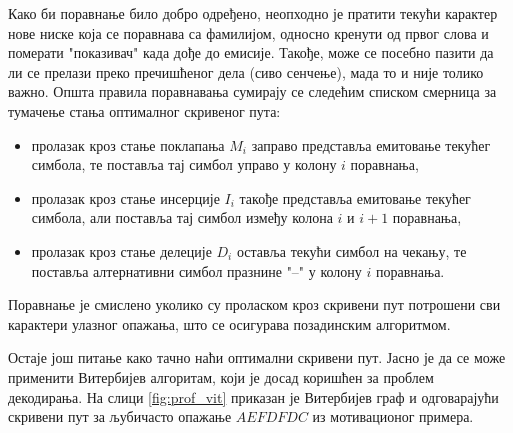 \documentclass[12pt,oneside]{memoir}
\begin{document}
\begin{CJK}{UTF8}{ipxm}
Како би поравнање било добро одређено, неопходно је пратити текући карактер нове ниске која се поравнава са фамилијом, односно кренути од првог слова и померати "показивач" када дође до емисије. Такође, може се посебно пазити да ли се прелази преко пречишћеног дела (сиво сенчење), мада то и није толико важно. Општа правила поравнавања сумирају се следећим списком смерница за тумачење стања оптималног скривеног пута:
\begin{itemize}
  \item пролазак кроз стање поклапања $M_i$ заправо представља емитовање текућег симбола, те поставља тај симбол управо у колону $i$ поравнања,
  \item пролазак кроз стање инсерције $I_i$ такође представља емитовање текућег симбола, али поставља тај симбол између колона $i$ и $i+1$ поравнања,
  \item пролазак кроз стање делеције $D_i$ оставља текући симбол на чекању, те поставља алтернативни симбол празнине "--" у колону $i$ поравнања.
\end{itemize}
Поравнање је смислено уколико су проласком кроз скривени пут потрошени сви карактери улазног опажања, што се осигурава позадинским алгоритмом.

Остаје још питање како тачно наћи оптимални скривени пут. Јасно је да се може применити Витербијев алгоритам, који је досад коришћен за проблем декодирања. На слици \ref{fig:prof_vit} приказан је Витербијев граф и одговарајући скривени пут за љубичасто опажање $AEFDFDC$ из мотивационог примера.


\end{CJK}
\end{document}
